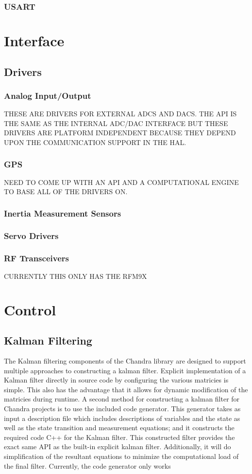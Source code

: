 \documentclass[10pt,letterpaper]{memoir} %
\begin{document}
\subsubsection{USART}

\section{Interface}
\subsection{Drivers}
\subsubsection{Analog Input/Output}
THESE ARE DRIVERS FOR EXTERNAL ADCS AND DACS.  THE API IS THE SAME AS THE INTERNAL ADC/DAC INTERFACE BUT THESE DRIVERS ARE PLATFORM INDEPENDENT BECAUSE THEY DEPEND UPON THE COMMUNICATION SUPPORT IN THE HAL.
\subsubsection{GPS}
NEED TO COME UP WITH AN API AND A COMPUTATIONAL ENGINE TO BASE ALL OF THE DRIVERS ON.
\subsubsection{Inertia Measurement Sensors}
\subsubsection{Servo Drivers}
\subsubsection{RF Transceivers}
CURRENTLY THIS ONLY HAS THE RFM9X

\section{Control}
\subsection{Kalman Filtering}
The Kalman filtering components of the Chandra library are designed to support multiple approaches to constructing a kalman filter.  Explicit implementation of a Kalman filter directly in source code by configuring the various matricies is simple.  This also has the advantage that it allows for dynamic modification of the matricies during runtime.  A second method for constructing a kalman filter for Chandra projects is to use the included code generator.  This generator takes as input a description file which includes descriptions of variables and the state as well as the state transition and measurement equations; and it constructs the required code C++ for the Kalman filter.  This constructed filter provides the exact same API as the built-in explicit kalman filter.  Additionally, it will do simplification of the resultant equations to minimize the computational load of the final filter.  Currently, the code generator only works 
\end{document}
